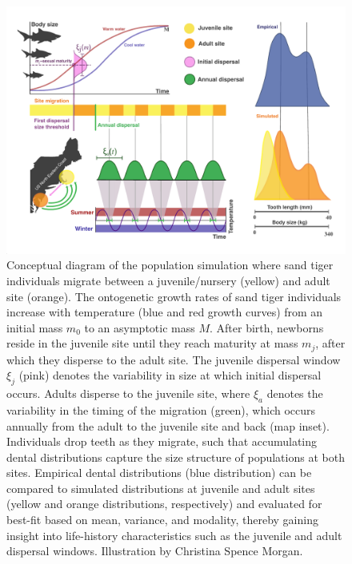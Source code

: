 \documentclass[]{rsos}%
\begin{document}
\begin{figure}
  \centering
  \includegraphics[width=1\linewidth]{BodySizeFigure_Draft2_Jan20.pdf}  
   \caption{Conceptual diagram of the population simulation where sand tiger individuals migrate between a juvenile/nursery (yellow) and adult site (orange). 
   The ontogenetic growth rates of sand tiger individuals increase with temperature (blue and red growth curves) from an initial mass $m_0$ to an asymptotic mass $M$.
   After birth, newborns reside in the juvenile site until they reach maturity at mass $m_j$, after which they disperse to the adult site.
   The juvenile dispersal window $\xi_j$ (pink) denotes the variability in size at which initial dispersal occurs. 
   Adults disperse to the juvenile site, where $\xi_a$ denotes the variability in the timing of the migration (green), which occurs annually from the adult to the juvenile site and back (map inset).
   Individuals drop teeth as they migrate, such that accumulating dental distributions capture the size structure of populations at both sites.
   Empirical dental distributions (blue distribution) can be compared to simulated distributions at juvenile and adult sites (yellow and orange distributions, respectively) and evaluated for best-fit based on mean, variance, and modality, thereby gaining insight into life-history characteristics such as the juvenile and adult dispersal windows. Illustration by Christina Spence Morgan.}
  \label{fig:diagram}
\end{figure}
\end{document}
